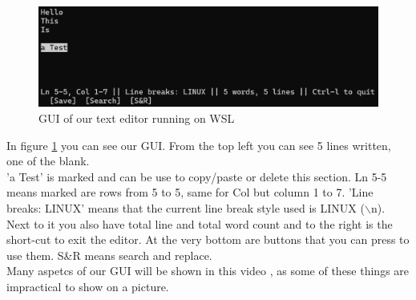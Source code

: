 \begin{figure}[h]
    \centering
    \includegraphics[width=1.0\linewidth]{figures/results_terminal.png}
    \caption{GUI of our text editor running on WSL}
    \label{fig:GUIterminal}            
\end{figure}
\noindent
In figure \ref{fig:GUIterminal} you can see our GUI. From the top left you can see 5 lines written, one of the blank.
\\'a Test' is marked and can be use to copy/paste or delete this section.
Ln 5-5 means marked are rows from 5 to 5, same for Col but column 1 to 7.
'Line breaks: LINUX' means that the current line break style used is LINUX ($\backslash$n).
\\Next to it you also have total line and total word count and to the right is the short-cut to exit the editor.
At the very bottom are buttons that you can press to use them. S\&R means search and replace.
\\Many aspetcs of our GUI will be shown in this video \cite{demo}, as some of these things are impractical to show on a picture.